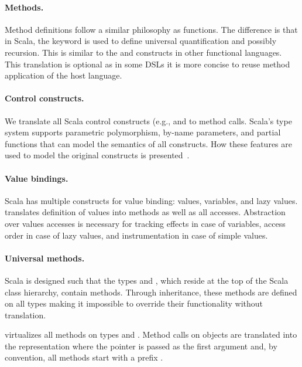  \paragraph{Methods.} Method definitions follow a similar philosophy as functions.
  The difference is that in Scala, the  keyword is used to define universal quantification and possibly recursion.
  This is similar to the  and  constructs in other functional languages. This translation is optional
  as in some DSLs it is more concise to reuse method application of the host language.

 \paragraph{Control constructs.} We translate all Scala control constructs (e.g., and  to method calls.
  Scala's type system supports parametric polymorphism, by-name parameters, and partial functions that can model
  the semantics of all constructs. How these features are used to model the original constructs is presented~\todo{}.

 \paragraph{Value bindings.} Scala has multiple constructs for value binding: values, variables, and lazy values. \yy translates
  definition of values into methods as well as all accesses. Abstraction over values accesses is
  necessary for tracking effects in case of variables, access order in case of lazy values, and instrumentation
  in case of simple values.

 \paragraph{Universal methods.} Scala is designed such that the types  and
 , which reside at the top of the Scala class hierarchy, contain
  methods. Through inheritance, these methods are defined on all
 types making it impossible to override their functionality without translation.

 \yy virtualizes all methods on types  and . Method calls on objects
  are translated into the representation where the  pointer is passed as the first argument and, by convention, all methods start
  with a prefix .

